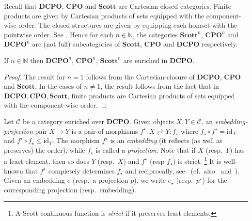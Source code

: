 \documentclass[%
  a4paper,
  UKenglish,
  cleveref,
  autoref,
  thm-restate,
  numberwithinsect,
]{lipics-v2021}
\newcommand\NN{\mathbb{N}}
\newcommand\cat\mathcal
\newcommand\comp{\mathbin\circ}
\newcommand\id{\mathrm{id}}
\newcommand\ladj[1]{\ensuremath{{#1}^{\star}}}	%
\newcommand\radj[1]{\ensuremath{{#1}_{\star}}}	%
\newcommand\CPO{\mathbf{CPO}}
\newcommand\DCPO{\mathbf{DCPO}}
\newcommand\Scott{\mathbf{Scott}}
\begin{document}
Recall that $\DCPO$, $\CPO$ and $\Scott$ are Cartesian-closed categories.
Finite products are given by Cartesian products
of sets equipped with the component-wise order.
The closed structures are
given by equipping each homset with the pointwise order.
See \cite[Theorem~3.3.3, Theorem~3.3.5 and Corollary~4.1.6]{aj95chapter}.
Hence for each $n \in \NN$, the categories
$\Scott^n$, $\CPO^n$ and $\DCPO^n$
are (not full) subcategories of $\Scott$, $\CPO$ and $\DCPO$
respectively.

\begin{lemma}
\label{lem:proof:scott:enrich}
If $n \in \NN$ then
$\DCPO^n$,
$\CPO^n$, $\Scott^n$ are enriched in $\DCPO$.
\end{lemma}

\begin{proof}
The result for $n=1$ follows from the
Cartesian-closure of $\DCPO$, $\CPO$ and $\Scott$.
In the cases of $n \neq 1$, the result follows from the fact that
in $\DCPO, \CPO, \Scott$, finite products are Cartesian products
of sets equipped with the component-wise order.
\end{proof}

Let $\cat C$ be a category enriched over $\DCPO$.
Given objects $X,Y \in \cat C$,
an \emph{embedding-projection} pair $X \to Y$
is a pair of morphisms $\ladj f: X\rightleftarrows Y:\radj f$
where $\radj f \comp \ladj f = \id_X$ and $\ladj f \comp \radj f \leq \id_Y$.
The morphism $\ladj f$ is an \emph{embedding}
(it reflects (as well as preserves) the order),
while $\radj f$ is called a \emph{projection}.
Note that if $X$ (resp.\ $Y$) has a least element,
then so does $Y$ (resp.\ $X$) and $\ladj f$ (resp $\radj f$)
is strict.%
\footnote{A Scott-continuous function is \emph{strict} if it preserves
least elements.}
It is well-known that $\ladj f$ completely determines $\radj f$
and reciprocally, see~\cite[\S 7.1]{ac98book}
(cf.\ also~\cite[\S 3.1.4]{aj95chapter} and~\cite[\S 9]{streicher06book}).
Given an embedding $e$ (resp.\ a projection $p$),
we write $\radj e$ (resp.\ $\ladj p$)
for the corresponding projection (resp.\ embedding).
\end{document}
